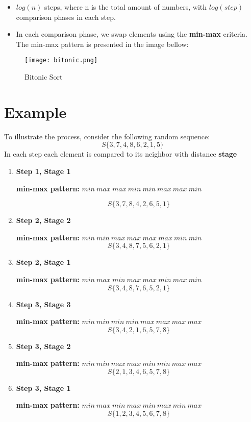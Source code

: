\documentclass[12pt]{report}
\begin{document}
\begin{itemize}
    \item $log(n)$ steps, where n is the total amount of numbers, with $log(step)$ comparison phases in each step.
    \item In each comparison phase, we swap elements using the \textbf{min-max} criteria. The min-max pattern is presented in the image bellow:
\end{itemize}
\begin{figure}
    \centering
    \texttt{[image: bitonic.png]}
    \caption{Bitonic Sort}
    \label{fig:enter-label}
\end{figure}
\section{Example}

To illustrate the process, consider the following random sequence:
\[S\{ 3,7,4,8,6,2,1,5 \}\]
In each step each element is compared to its neighbor with distance \textbf{stage}
\begin{enumerate}
\item \textbf{Step 1, Stage 1}

\textbf{min-max pattern:} $min\:max\:max\:min\:min\:max\:max\:min$

\[
    S\{3,7,8,4,2,6,5,1\}
\]

\item \textbf{Step 2, Stage 2}

\textbf{min-max pattern:} $min\:min\:max\:max\:max\:max\:min\:min$
\[
    S\{3,4,8,7,5,6,2,1\}
\]

\item \textbf{Step 2, Stage 1}

\textbf{min-max pattern:} $min\:max\:min\:max\:max\:min\:max\:min$
\[
    S\{3,4,8,7,6,5,2,1\}
\]

\item \textbf{Step 3, Stage 3}

\textbf{min-max pattern:} $min\:min\:min\:min\:max\:max\:max\:max$
\[
    S\{3,4,2,1,6,5,7,8\}
\]

\item \textbf{Step 3, Stage 2}

\textbf{min-max pattern:} $min\:min\:max\:max\:min\:min\:max\:max$
\[
    S\{2,1,3,4,6,5,7,8\}
\]

\item \textbf{Step 3, Stage 1}

\textbf{min-max pattern:} $min\:max\:min\:max\:min\:max\:min\:max$
\[
    S\{1, 2, 3, 4, 5, 6, 7, 8\}
\]
\end{enumerate}
\end{document}

